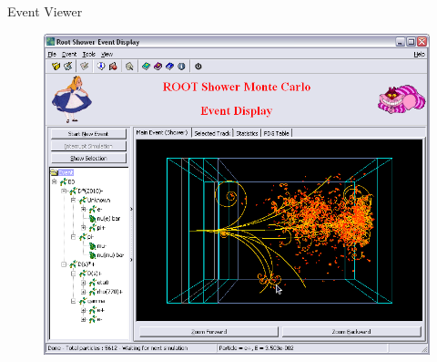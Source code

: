 \begin{frame}{Event Viewer}
  \begin{figure}[htb]
      \includegraphics[width=0.97\linewidth, keepaspectratio]{./resources/shower_event_viewer.png}
      \nocite{cern:root:eventviewer}
   \end{figure}
\end{frame}

